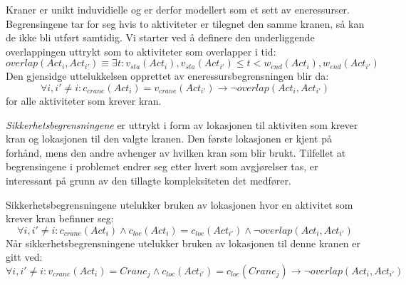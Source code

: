 Kraner er unikt induvidielle og er derfor modellert som et sett av eneressurser. Begrensingene tar for seg hvis to aktiviteter er tilegnet den samme kranen, så kan de ikke bli utført samtidig. Vi starter ved å definere den underliggende overlappingen uttrykt som to aktiviteter som overlapper i tid: 
\begin{equation}
overlap(Act_{i},Act_{i'}) \equiv \exists t : v_{sta}(Act_{i}),v_{sta}(Act_{i'}) \leq t < w_{end}(Act_{i}),w_{end}(Act_{i'})
\end{equation}
Den gjensidge uttelukkelsen opprettet av eneressursbegrensningen blir da: 
\begin{equation}
\forall i,i' \neq i : c_{crane}(Act_{i}) = v_{crane}(Act_{i'}) \rightarrow \neg overlap(Act_{i},Act_{i'})
\end{equation}
for alle aktiviteter som krever kran.

\textit{Sikkerhetsbegrensningene} er uttrykt i form av lokasjonen til aktiviten som krever kran og lokasjonen til den valgte kranen. Den første lokasjonen er kjent på forhånd, mens den andre avhenger av hvilken kran som blir brukt. Tilfellet at begrensingene i problemet endrer seg etter hvert som avgjørelser tas, er interessant på grunn av den tillagte kompleksiteten det medfører.

Sikkerhetsbegrensningene utelukker bruken av lokasjonen hvor en aktivitet som krever kran befinner seg:
\begin{equation}
\forall i,i' \neq i : c_{crane}(Act_{i}) \wedge c_{loc}(Act_{i}) = c_{loc}(Act_{i'}) \wedge \neg overlap(Act_{i},Act_{i'})
\end{equation}
Når sikkerhetsbegrensningene utelukker bruken av lokasjonen til denne kranen er gitt ved:
\begin{equation}
\forall i,i' \neq i : v_{crane}(Act_{i}) = Crane_{j} \wedge c_{loc}(Act_{i'}) = c_{loc}(Crane_{j}) \rightarrow \neg overlap(Act_{i},Act_{i'})
\end{equation}

